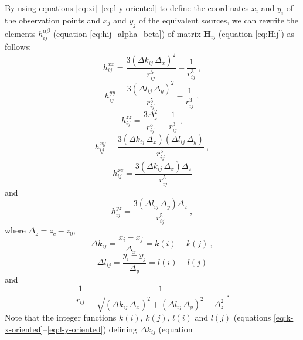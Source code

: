 \documentclass[manuscript]{geophysics}
\begin{document}
By using equations \ref{eq:xi}--\ref{eq:l-y-oriented} to define the coordinates $x_{i}$ and 
$y_{i}$ of the observation points and $x_{j}$ and $y_{j}$ of the equivalent sources, we can
rewrite the elements $h^{\alpha\beta}_{ij}$ (equation \ref{eq:hij_alpha_beta}) of matrix 
$\mathbf{H}_{ij}$ (equation \ref{eq:Hij}) as follows:
\begin{equation}
	h^{xx}_{ij} = 
	\frac{3 \left( \Delta k_{ij} \, \Delta_{x} \right)^{2}}{r_{ij}^{5}} - \frac{1}{r_{ij}^{3}} \: ,
	\label{eq:hxx_regular}
\end{equation}
\begin{equation}
	h^{yy}_{ij} = 
	\frac{3 \left( \Delta l_{ij} \, \Delta_{y} \right)^{2}}{r_{ij}^{5}} - \frac{1}{r_{ij}^{3}} \: ,
	\label{eq:hyy_regular}
\end{equation}
\begin{equation}
	h^{zz}_{ij} = 
	\frac{3 \Delta_{z}^{2}}{r_{ij}^{5}} - \frac{1}{r_{ij}^{3}} \: ,
	\label{eq:hzz_regular}
\end{equation}
\begin{equation}
	h^{xy}_{ij} = 
	\frac{3 \left( \Delta k_{ij} \, \Delta_{x} \right)\left( \Delta l_{ij} \, \Delta_{y} \right)}{r_{ij}^{5}} \: ,
	\label{eq:hxy_regular}
\end{equation}
\begin{equation}
	h^{xz}_{ij} = 
	\frac{3 \left( \Delta k_{ij} \, \Delta_{x} \right) \Delta_{z}}{r_{ij}^{5}}
	\label{eq:hxz_regular}
\end{equation}
and
\begin{equation}
	h^{yz}_{ij} = 
	\frac{3 \left( \Delta l_{ij} \, \Delta_{y} \right) \Delta_{z}}{r_{ij}^{5}} \: ,
	\label{eq:hyz_regular}
\end{equation}
where $\Delta_{z} = z_{c} - z_{0}$, 
\begin{equation}
	\Delta k_{ij} = \frac{x_{i} - x_{j}}{\Delta_{x}} = k(i) - k(j) \: ,
	\label{eq:Delta_kij}
\end{equation}
\begin{equation}
	\Delta l_{ij} = \frac{y_{i} - y_{j}}{\Delta_{y}} = l(i) - l(j)
	\label{eq:Delta_lij}
\end{equation}
and 
\begin{equation}
	\frac{1}{r_{ij}} = 
	\frac{1}{\sqrt{\left( \Delta k_{ij} \, \Delta_{x} \right)^{2} + \left( \Delta l_{ij} \, \Delta_{y} \right)^{2} + \Delta_{z}^{2}}} \: .
	\label{eq:1_rij_regular}
\end{equation}
Note that the integer functions $k(i)$, $k(j)$, $l(i)$ and $l(j)$ (equations 
\ref{eq:k-x-oriented}--\ref{eq:l-y-oriented}) defining $\Delta k_{ij}$ (equation
\end{document}
